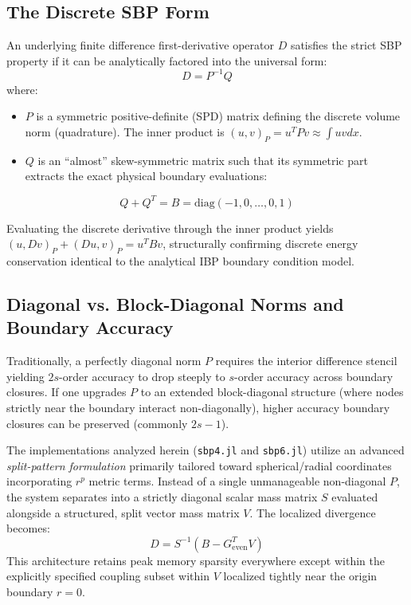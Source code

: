 \documentclass[reprint,amsmath,amssymb,aps]{revtex4-2}
\begin{document}
\subsection{The Discrete SBP Form}
An underlying finite difference first-derivative operator $D$ satisfies the strict SBP property if it can be analytically factored into the universal form:
\begin{equation}
    D = P^{-1}Q
\end{equation}
where:
\begin{itemize}
    \item $P$ is a symmetric positive-definite (SPD) matrix defining the discrete volume norm (quadrature). The inner product is $(u, v)_P = u^T P v \approx \int u v dx$.
    \item $Q$ is an ``almost'' skew-symmetric matrix such that its symmetric part extracts the exact physical boundary evaluations:
\end{itemize}
\begin{equation}
    Q + Q^T = B = \text{diag}(-1, 0, \dots, 0, 1)
\end{equation}

Evaluating the discrete derivative through the inner product yields $(u, Dv)_P + (Du, v)_P = u^T B v$, structurally confirming discrete energy conservation identical to the analytical IBP boundary condition model.

\subsection{Diagonal vs. Block-Diagonal Norms and Boundary Accuracy}
Traditionally, a perfectly diagonal norm $P$ requires the interior difference stencil yielding $2s$-order accuracy to drop steeply to $s$-order accuracy across boundary closures. If one upgrades $P$ to an extended block-diagonal structure (where nodes strictly near the boundary interact non-diagonally), higher accuracy boundary closures can be preserved (commonly $2s-1$). 

The implementations analyzed herein (\texttt{sbp4.jl} and \texttt{sbp6.jl}) utilize an advanced \textit{split-pattern formulation} primarily tailored toward spherical/radial coordinates incorporating $r^p$ metric terms. Instead of a single unmanageable non-diagonal $P$, the system separates into a strictly diagonal scalar mass matrix $S$ evaluated alongside a structured, split vector mass matrix $V$. The localized divergence becomes:
\begin{equation}
    D = S^{-1}(B - G_{\text{even}}^T V)
\end{equation}
This architecture retains peak memory sparsity everywhere except within the explicitly specified coupling subset within $V$ localized tightly near the origin boundary $r=0$.
\end{document}

